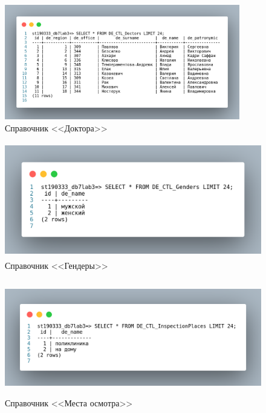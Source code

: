 \begin{figure}[p!h]
  \centering

  \includegraphics[height=5cm]
  {inc/DE_CTL_Doctors.png}

  \caption{Справочник <<Доктора>>}

  \label{fig:DE_CTL_Doctors}
\end{figure}


\begin{figure}[p!h]
  \centering

  \includegraphics[height=5cm]
  {inc/DE_CTL_Genders.png}

  \caption{Справочник <<Гендеры>>}

  \label{fig:DE_CTL_Genders}
\end{figure}

\begin{figure}[p!h]
  \centering

  \includegraphics[height=5cm]
  {inc/DE_CTL_InspectionPlaces.png}

  \caption{Справочник <<Места осмотра>>}

  \label{fig:DE_CTL_InspectionPlaces}
\end{figure}

